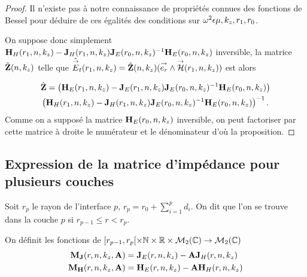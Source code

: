 \begin{proof}
      Il n'existe pas à notre connaissance de propriétés connues des fonctions de Bessel pour déduire de ces égalités des conditions sur \(\omega^2\eps\mu,k_z,r_1,r_0\).

      On suppose donc simplement \(\mH_{H}(r_1,n,k_z) - \mJ_{H}(r_1,n,k_z)\mJ_{E}(r_0,n,k_z)^{-1}\mH_{E}(r_0,n,k_z)\) inversible, la matrice \(\hat\mZ(n,k_z)\) telle que \(\hat\vE_t(r_1,n,k_z) = \hat\mZ(n,k_z) (\vect{e_r}\pvect\vH(r_1,n,k_z))\) est alors

      \begin{multline*}
        \hat \mZ =
        \left(\mH_{E}(r_1,n,k_z) - \mJ_{E}(r_1,n,k_z)\mJ_{E}(r_0,n,k_z)^{-1}\mH_{E}(r_0,n,k_z)\right)
        \\
        \left(\mH_{H}(r_1,n,k_z) - \mJ_{H}(r_1,n,k_z)\mJ_{E}(r_0,n,k_z)^{-1}\mH_{E}(r_0,n,k_z)\right)^{-1}.
      \end{multline*}
      Comme on a supposé la matrice \(\mH_E(r_0,n,k_z)\) inversible, on peut factoriser par cette matrice à droite le numérateur et le dénominateur d'où la proposition.

    \end{proof}


  \subsection{Expression de la matrice d'impédance pour plusieurs couches}

    \begin{figure}[!hbt]
      \centering
      \begin{tikzpicture}
        
      \end{tikzpicture}
    \end{figure}

    Soit \(r_p\) le rayon de l'interface \(p\), \(r_p = r_0 +\sum_{i=1}^{p} d_{i}\). On dit que l'on se trouve dans la couche \(p\) si \(r_{p-1} \le r < r_p \).

    \begin{defn}
      \label{def:cylindre:matrices_MJ-MH}
      On définit les fonctions de \([r_{p-1}, r_p[\times \NN \times \RR \times \mathcal{M}_{2}(\CC) \rightarrow \mathcal{M}_{2}(\CC)\)
      \begin{align*}
        \mM_{\mJ}(r,n,k_z,\mA) &= \mJ_{E}(r,n,k_z) -  \mA \mJ_{H}(r,n,k_z)
        \\
        \mM_{\mH}(r,n,k_z,\mA) &= \mH_{E}(r,n,k_z) -  \mA \mH_{H}(r,n,k_z)
      \end{align*}
    \end{defn}

